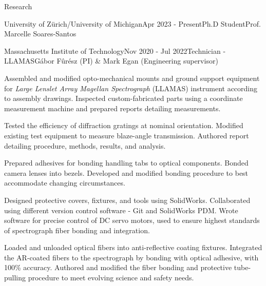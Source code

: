 \documentclass{resume} %
\begin{document}
\begin{rSection}{Research}
\begin{rSubsection}{University of Zürich/University of Michigan}{Apr 2023 - Present}{Ph.D Student}{Prof. Marcelle Soares-Santos}
\begin{rSubsection}{Massachusetts Institute of Technology}{Nov 2020 - Jul 2022}{Technician - LLAMAS}{G\'abor F\^ur\'esz (PI) \& Mark Egan (Engineering supervisor)}
\item Assembled and modified opto-mechanical mounts and ground support equipment for \textit{Large Lenslet Array Magellan Spectrograph} (LLAMAS) instrument according to assembly drawings. Inspected custom-fabricated parts using a coordinate measurement machine and prepared reports detailing measurements.
\item Tested the efficiency of diffraction gratings at nominal orientation. Modified existing test equipment to measure blaze-angle transmission. Authored report detailing procedure, methods, results, and analysis.
\item Prepared  adhesives for bonding handling tabs to optical components. Bonded camera lenses into bezels. Developed and modified bonding procedure to best accommodate changing circumstances. 
\item Designed protective covers, fixtures, and tools using SolidWorks. Collaborated using different version control software - Git and SolidWorks PDM. Wrote software for precise control of DC servo motors, used to ensure highest standards of spectrograph fiber bonding and integration.
\item Loaded and unloaded optical fibers into anti-reflective coating fixtures. Integrated the AR-coated fibers to the spectrograph by bonding with optical adhesive, with 100\% accuracy. Authored and modified the fiber bonding and protective tube-pulling procedure to meet evolving science and safety needs.
\end{rSubsection}


\end{rSubsection}
\end{rSection}
\end{document}
